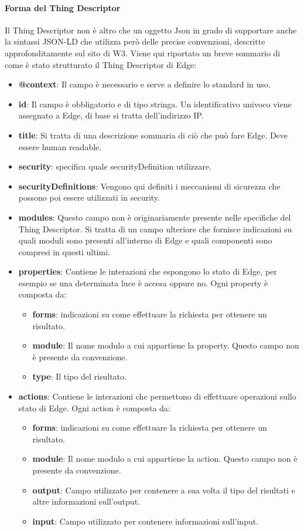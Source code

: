 \paragraph{Forma del Thing Descriptor}
Il Thing Descriptor non è altro che un oggetto Json in grado di supportare anche la sintassi JSON-LD che utilizza però delle precise convenzioni, descritte approfonditamente sul sito di W3. Viene qui riportato un breve sommario di come è stato strutturato il Thing Descriptor di Edge:
\begin{itemize}
	\item \textbf{@context}: Il campo è necessario e serve a definire lo standard in uso.
	\item \textbf{id}: Il campo è obbligatorio e di tipo stringa. Un identificativo univoco viene assegnato a Edge, di base si tratta dell’indirizzo IP.
	\item \textbf{title}: Si tratta di una descrizione sommaria di ciò che può fare Edge. Deve essere human readable.
	\item \textbf{security}: specifica quale securityDefinition utilizzare.
	\item \textbf{securityDefinitions}: Vengono qui definiti i meccanismi di sicurezza che possono poi essere utilizzati in security.
	\item \textbf{modules}: Questo campo non è originariamente presente nelle specifiche del Thing Descriptor. Si tratta di un campo ulteriore che fornisce indicazioni su quali moduli sono presenti all’interno di Edge e quali componenti sono compresi in questi ultimi.
	\item \textbf{properties}: Contiene le interazioni che espongono lo stato di Edge, per esempio se una determinata luce è accesa oppure no.
	Ogni property è composta da:
	\begin{itemize}
		\item \textbf{forms}: indicazioni su come effettuare la richiesta per ottenere un risultato.
		\item \textbf{module}: Il nome modulo a cui appartiene la property. Questo campo non è presente da convenzione.
		\item \textbf{type}: Il tipo del risultato.
	\end{itemize}
	\item \textbf{actions}: Contiene le interazioni che permettono di effettuare operazioni sullo stato di Edge. Ogni action è composta da:
	\begin{itemize}
		\item \textbf{forms}: indicazioni su come effettuare la richiesta per ottenere un risultato.
		\item \textbf{module}: Il nome modulo a cui appartiene la action. Questo campo non è presente da convenzione.
		\item \textbf{output}: Campo utilizzato per contenere a sua volta il tipo del risultati e altre informazioni sull’output.
		\item \textbf{input}: Campo utilizzato per contenere informazioni sull’input.
	\end{itemize}
\end{itemize}
